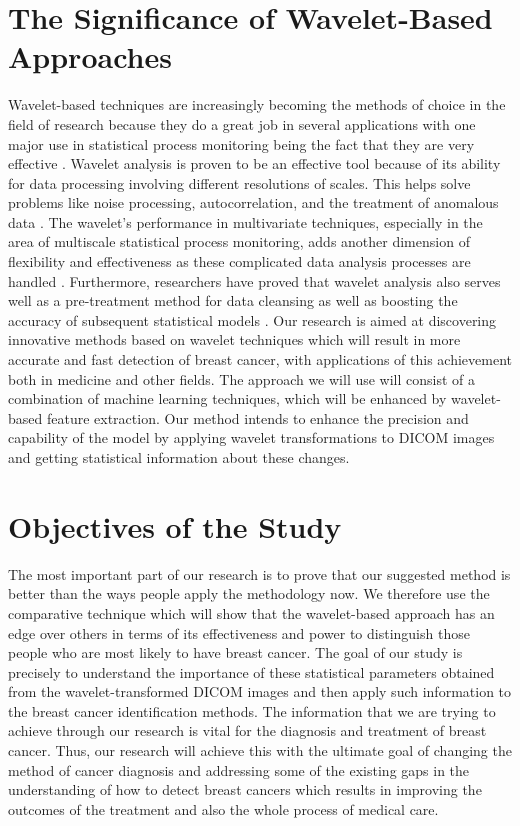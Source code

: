 \section{The Significance of Wavelet-Based Approaches}
Wavelet-based techniques are increasingly becoming the methods of choice in the field of research because they do a great job in several applications with one major use in statistical process monitoring being the fact that they are very effective \cite{WaveletStatistics}. Wavelet analysis is proven to be an effective tool because of its ability for data processing involving different resolutions of scales. This helps solve problems like noise processing, autocorrelation, and the treatment of anomalous data \cite{WaveletStatistics}. The wavelet's performance in multivariate techniques, especially in the area of multiscale statistical process monitoring, adds another dimension of flexibility and effectiveness as these complicated data analysis processes are handled \cite{WaveletStatistics}. Furthermore, researchers have proved that wavelet analysis also serves well as a pre-treatment method for data cleansing as well as boosting the accuracy of subsequent statistical models \cite{Michael2006}.
\newline Our research is aimed at discovering innovative methods based on wavelet techniques which will result in more accurate and fast detection of breast cancer, with applications of this achievement both in medicine and other fields. The approach we will use will consist of a combination of machine learning techniques, which will be enhanced by wavelet-based feature extraction. Our method intends to enhance the precision and capability of the model by applying wavelet transformations to DICOM images and getting statistical information about these changes.

\section{Objectives of the Study}
The most important part of our research is to prove that our suggested method is better than the ways people apply the methodology now. We therefore use the comparative technique which will show that the wavelet-based approach has an edge over others in terms of its effectiveness and power to distinguish those people who are most likely to have breast cancer.
\newline The goal of our study is precisely to understand the importance of these statistical parameters obtained from the wavelet-transformed DICOM images and then apply such information to the breast cancer identification methods. The information that we are trying to achieve through our research is vital for the diagnosis and treatment of breast cancer. Thus, our research will achieve this with the ultimate goal of changing the method of cancer diagnosis and addressing some of the existing gaps in the understanding of how to detect breast cancers which results in improving the outcomes of the treatment and also the whole process of medical care.